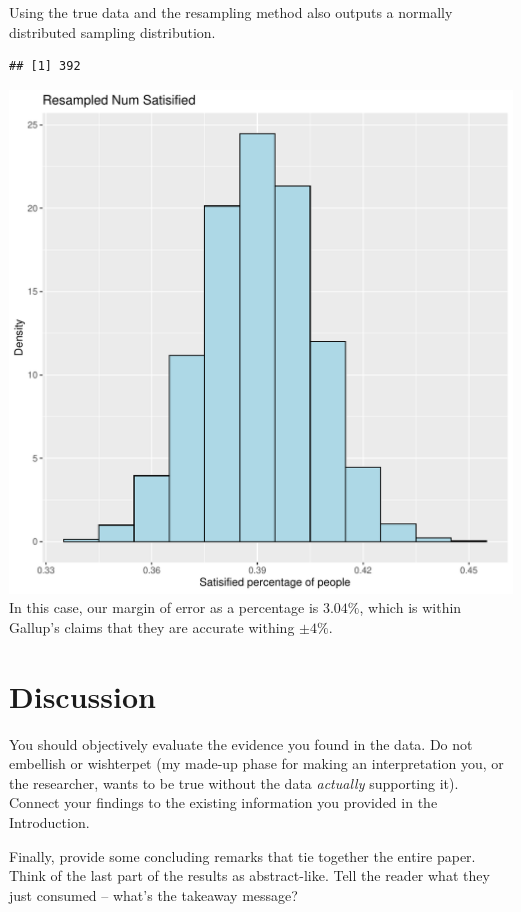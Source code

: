\documentclass{article}\usepackage[]{graphicx}\usepackage[]{xcolor}
\makeatletter
\def\maxwidth{ %
  \ifdim\Gin@nat@width>\linewidth
    \linewidth
  \else
    \Gin@nat@width
  \fi
}
\newenvironment{kframe}{%
 \def\at@end@of@kframe{}%
 \ifinner\ifhmode%
  \def\at@end@of@kframe{\end{minipage}}%
  \begin{minipage}{\columnwidth}%
 \fi\fi%
 \def\FrameCommand##1{\hskip\@totalleftmargin \hskip-\fboxsep
 \colorbox{shadecolor}{##1}\hskip-\fboxsep
     \hskip-\linewidth \hskip-\@totalleftmargin \hskip\columnwidth}%
 \MakeFramed {\advance\hsize-\width
   \@totalleftmargin\z@ \linewidth\hsize
   \@setminipage}}%
 {\par\unskip\endMakeFramed%
 \at@end@of@kframe}
\newenvironment{knitrout}{}{} %
\makeatother
\begin{document}
\begin{multicols}{2}
Using the true data and the resampling method also outputs a normally distributed sampling distribution.
\begin{knitrout}\scriptsize
{}\color{fgcolor}\begin{kframe}
\begin{verbatim}
## [1] 392
\end{verbatim}
\end{kframe}
\includegraphics[width=\maxwidth]{figure/unnamed-chunk-2-1} 
\end{knitrout}
In this case, our margin of error as a percentage is $3.04\%$, which is within Gallup's claims that they are accurate withing $\pm 4\%$. 


\section{Discussion}
 You should objectively evaluate the evidence you found in the data. Do not embellish or wish\-terpet (my made-up phase for making an interpretation you, or the researcher, wants to be true without the data \emph{actually} supporting it). Connect your findings to the existing information you provided in the Introduction.

Finally, provide some concluding remarks that tie together the entire paper. Think of the last part of the results as abstract-like. Tell the reader what they just consumed -- what's the takeaway message?


\end{multicols}
\end{document}
